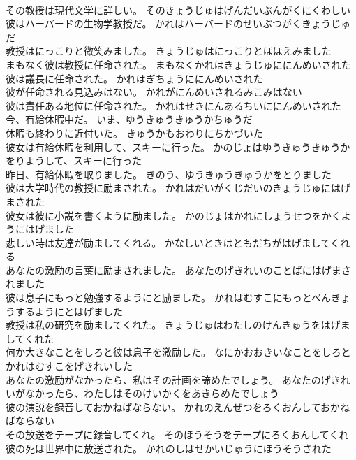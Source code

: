 \documentclass[8pt]{extreport}
\begin{document}
\begin{CJK}{UTF8}{min}
\\	その教授は現代文学に詳しい。	そのきょうじゅはげんだいぶんがくにくわしい 
\\	彼はハーバードの生物学教授だ。	かれはハーバードのせいぶつがくきょうじゅだ 
\\	教授はにっこりと微笑みました。	きょうじゅはにっこりとほほえみました 
\\	まもなく彼は教授に任命された。	まもなくかれはきょうじゅににんめいされた 
\\	彼は議長に任命された。	かれはぎちょうににんめいされた 
\\	彼が任命される見込みはない。	かれがにんめいされるみこみはない 
\\	彼は責任ある地位に任命された。	かれはせきにんあるちいににんめいされた 
\\	今、有給休暇中だ。	いま、ゆうきゅうきゅうかちゅうだ 
\\	休暇も終わりに近付いた。	きゅうかもおわりにちかづいた 
\\	彼女は有給休暇を利用して、スキーに行った。	かのじょはゆうきゅうきゅうかをりようして、スキーに行った 
\\	昨日、有給休暇を取りました。	きのう、ゆうきゅうきゅうかをとりました 
\\	彼は大学時代の教授に励まされた。	かれはだいがくじだいのきょうじゅにはげまされた 
\\	彼女は彼に小説を書くように励ました。	かのじょはかれにしょうせつをかくようにはげました 
\\	悲しい時は友達が励ましてくれる。	かなしいときはともだちがはげましてくれる 
\\	あなたの激励の言葉に励まされました。	あなたのげきれいのことばにはげまされました 
\\	彼は息子にもっと勉強するようにと励ました。	かれはむすこにもっとべんきょうするようにとはげました 
\\	教授は私の研究を励ましてくれた。	きょうじゅはわたしのけんきゅうをはげましてくれた 
\\	何か大きなことをしろと彼は息子を激励した。	なにかおおきいなことをしろとかれはむすこをげきれいした 
\\	あなたの激励がなかったら、私はその計画を諦めたでしょう。	あなたのげきれいがなかったら、わたしはそのけいかくをあきらめたでしょう 
\\	彼の演説を録音しておかねばならない。	かれのえんぜつをろくおんしておかねばならない 
\\	その放送をテープに録音してくれ。	そのほうそうをテープにろくおんしてくれ 
\\	彼の死は世界中に放送された。	かれのしはせかいじゅうにほうそうされた 

\end{CJK}
\end{document}
